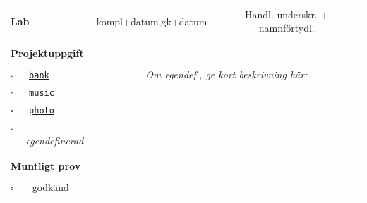 \begin{table}[h]
\vspace{-1.5em}
\begin{tabular}{lcc}
\\
{\sffamily\bfseries\small Lab} & {\sffamily\small kompl+datum,gk+datum } &	
{\sffamily\small Handl. underskr. + namnförtydl.}\\ %
\\[-0.4em]

\\ 
{\sffamily\small {\bfseries Projektuppgift}} & \dotfill &  \dotfill  \\
\\
{\Large$\square$}\texttt{~~~\hyperref[section:proj:bank]{bank}} &
\multicolumn{2}{c}{\textit{Om egendef., ge kort beskrivning här:}}  \\[0.5em] %
{\Large$\square$}\texttt{~~~\hyperref[section:proj:music]{music}} \\[0.5em] %
{\Large$\square$}\texttt{~~~\hyperref[section:proj:photo]{photo}}  \\[0.5em] %
{\Large$\square$}\texttt{~~~}\textit{egendefinerad}  \\
\\
\\
{\sffamily\small {\bfseries Muntligt prov}} &  & \\
\\
{\Large$\square$}\texttt{~~~} godkänd & \dotfill &  \dotfill \\
\end{tabular}
\end{table}
